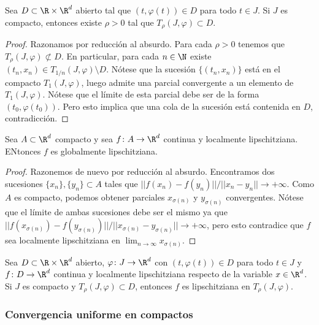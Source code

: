 \documentclass{article}
\begin{document}
\begin{lemma}
  Sea $D \subset \R \times \R^d$ abierto tal que $(t, \varphi(t)) \in D$ para todo $t \in J$. Si $J$
  es compacto, entonces existe $\rho > 0$ tal que $T_{\rho}(J,\varphi) \subset D$.
\end{lemma}
\begin{proof}
  Razonamos por reducción al absurdo. Para cada $\rho > 0$ tenemos que
  $T_{\rho}(J, \varphi) \not \subset D$. En particular, para cada $n \in \N$ existe
  $(t_n, x_n) \in T_{1/n}(J,\varphi) \setminus D$. Nótese que la sucesión $\{(t_n,x_n)\}$ está en el
  compacto $T_1(J,\varphi)$, luego admite una parcial convergente a un elemento de
  $T_1(J,\varphi)$. Nótese que el límite de esta parcial debe ser de la forma $(t_0,
  \varphi(t_0))$. Pero esto implica que una cola de la sucesión está contenida en $D$,
  contradicción.
\end{proof}

\begin{lemma}
  Sea $A \subset \R^d$ compacto y sea $f \colon A \to \R^d$ continua y localmente
  lipschitziana. ENtonces $f$ es globalmente lipschitziana.
\end{lemma}
\begin{proof}
  Razonemos de nuevo por reducción al absurdo. Encontramos dos sucesiones
  $\{x_n\}, \{y_n\} \subset A$ tales que $||f(x_n) - f(y_n)|| / || x_n - y_n|| \to +\infty$.  Como
  $A$ es compacto, podemos obtener parciales $x_{\sigma(n)}$ y $y_{\sigma(n)}$ convergentes. Nótese
  que el límite de ambas sucesiones debe ser el mismo ya que
  $||f(x_{\sigma(n)}) - f(y_{\sigma(n)})|| / || x_{\sigma(n)} - y_{\sigma(n)}|| \to +\infty$, pero
  esto contradice que $f$ sea localmente lipschitziana en $\lim_{n \to \infty} x_{\sigma(n)}$.
\end{proof}

\begin{proposition}
  Sea $D \subset \R \times \R^d$ abierto, $\varphi \colon J \to \R^d$ con $(t,\varphi(t)) \in D$
  para todo $t \in J$ y $f \colon D \to \R^d$ continua y localmente lipschitziana respecto de la
  variable $x \in \R^d$. Si $J$ es compacto y $T_{\rho}(J,\varphi) \subset D$, entonces $f$ es
  lipschitziana en $T_{\rho}(J,\varphi)$.
\end{proposition}

\subsubsection{Convergencia uniforme en compactos}
\end{document}

